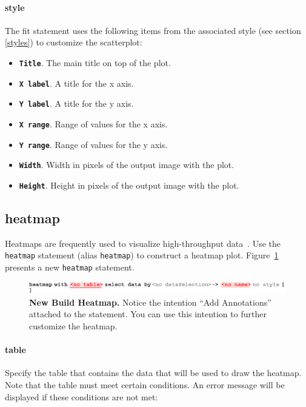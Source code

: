\paragraph{style}
The fit statement uses the following items from the associated style (see section \ref{styles}) to customize the scatterplot:
\begin{itemize}
\item \textbf{ \texttt{Title}}. The main title on top of the plot.
\item \textbf{ \texttt{X label}}. A title for the x axis.
\item \textbf{ \texttt{Y label}}. A title for the y axis.
\item \textbf{ \texttt{X range}}. Range of values for the x axis.
\item \textbf{ \texttt{Y range}}. Range of values for the y axis.
\item \textbf{ \texttt{Width}}. Width in pixels of the output image with the plot.
\item \textbf{ \texttt{Height}}. Height in pixels of the output image with the plot. 
\end{itemize}

\subsection{heatmap}
Heatmaps are frequently used to visualize high-throughput data~\cite{Cook2007}. Use the \texttt{heatmap} statement (alias \texttt{heatmap}) to construct a heatmap plot. Figure~\ref{fig:NewBuildHeatmap} presents a new \texttt{heatmap} statement.

\begin{figure}[h!tbp]
  \centering
  \includegraphics[width=\figWidthWide]{figures/NewBuildHeatmap.pdf}
\caption[New Heatmap.]{\textbf{New Build Heatmap.} Notice the intention ``Add Annotations'' attached to the statement. You can use this intention to further customize the heatmap.}
\label{fig:NewBuildHeatmap}
\end{figure}

\paragraph{table}
Specify the table that contains the data that will be used to draw the heatmap. Note that the table must meet certain conditions. An error message will be displayed if these conditions are not met:

